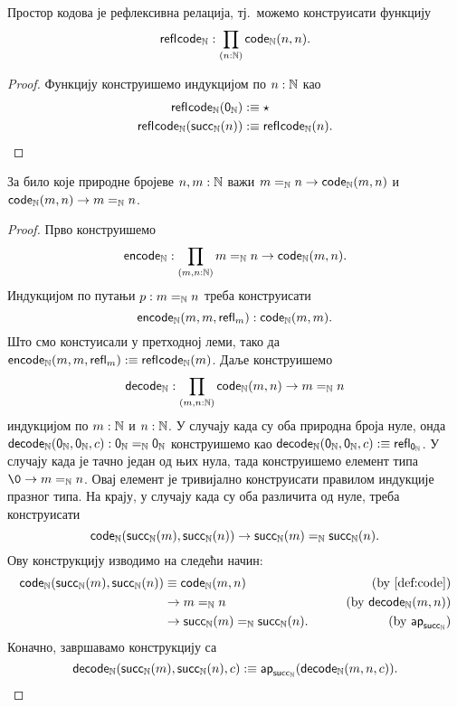 \documentclass[12pt,oneside]{memoir}
\begin{document}
\begin{lemma}
    Простор кодова је рефлексивна релација, тј.~можемо конструисати функцију
    \[\mathsf{refl}_{}\mathsf{code}_{{\mathbb{N}}} : \prod_{(n : {\mathbb{N}})} \mathsf{code}_{{\mathbb{N}}} (n, n).\]
\end{lemma}
\begin{proof}
    Функцију конструишемо индукцијом по $n : {\mathbb{N}}$ као
    \begin{align*}
        \mathsf{refl}_{}\mathsf{code}_{{\mathbb{N}}} (\mathsf{0}_\mathbb{N}) &:\equiv \star \\
        \mathsf{refl}_{}\mathsf{code}_{{\mathbb{N}}} (\mathsf{succ}_\mathbb{N}(n)) &:\equiv \mathsf{refl}_{}\mathsf{code}_{{\mathbb{N}}} (n).
    \end{align*}
\end{proof}

\begin{lemma}
    За било које природне бројеве $n, m : {\mathbb{N}}$ важи $m =_{{\mathbb{N}}} n \to \mathsf{code}_{{\mathbb{N}}} (m, n)$ и $\mathsf{code}_{{\mathbb{N}}} (m, n) \to m =_{{\mathbb{N}}} n$.
\end{lemma}
\begin{proof}
    Прво конструишемо
    \[ \mathsf{encode}_{{\mathbb{N}}} : \prod_{(m, n : {\mathbb{N}})} m =_{{\mathbb{N}}} n \to \mathsf{code}_{{\mathbb{N}}}(m, n). \]
    Индукцијом по путањи $p : m =_{{\mathbb{N}}} n$ треба конструисати 
    \[ \mathsf{encode}_{{\mathbb{N}}} (m, m, \mathsf{refl}_{m}) : \mathsf{code}_{{\mathbb{N}}} (m, m). \]
    Што смо констуисали у претходној леми, тако да $\mathsf{encode}_{{\mathbb{N}}} (m, m, \mathsf{refl}_{m}) :\equiv \mathsf{refl}_{}\mathsf{code}_{{\mathbb{N}}} (m)$.
    Даље конструишемо
    \[ \mathsf{decode}_{{\mathbb{N}}} : \prod_{(m, n : {\mathbb{N}})} \mathsf{code}_{{\mathbb{N}}}(m, n) \to m =_{{\mathbb{N}}} n \]
    индукцијом по $m : {\mathbb{N}}$ и $n : {\mathbb{N}}$. У случају када су оба природна броја нуле, онда $\mathsf{decode}_{{\mathbb{N}}} (\mathsf{0}_\mathbb{N}, \mathsf{0}_\mathbb{N}, c) : \mathsf{0}_\mathbb{N} =_{{\mathbb{N}}} \mathsf{0}_\mathbb{N}$ конструишемо као $\mathsf{decode}_{{\mathbb{N}}} (\mathsf{0}_\mathbb{N}, \mathsf{0}_\mathbb{N}, c) :\equiv \mathsf{refl}_{\mathsf{0}_\mathbb{N}}$.
    У случају када је тачно један од њих нула, тада конструишемо елемент типа $\0 \to m =_{\N} n$. Овај елемент је тривијално конструисати правилом индукције празног типа. На крају, у случају када су оба различита од нуле, треба конструисати  
    \[ \mathsf{code}_{{\mathbb{N}}} (\mathsf{succ}_\mathbb{N}(m), \mathsf{succ}_\mathbb{N}(n)) \to \mathsf{succ}_\mathbb{N}(m) =_{{\mathbb{N}}} \mathsf{succ}_\mathbb{N}(n). \]
    Ову конструкцију изводимо на следећи начин:
    \begin{align*}
        \mathsf{code}_{{\mathbb{N}}} (\mathsf{succ}_\mathbb{N}(m), \mathsf{succ}_\mathbb{N}(n)) &\equiv \mathsf{code}_{{\mathbb{N}}} (m, n) &\qquad (\text{by }\ref{def:code})\\
                                         &\to  m =_{{\mathbb{N}}} n &\qquad (\text{by } \mathsf{decode}_{{\mathbb{N}}}(m, n)) \\
                                         &\to \mathsf{succ}_\mathbb{N}(m) =_{{\mathbb{N}}} \mathsf{succ}_\mathbb{N}(n). &\qquad (\text{by }\mathsf{ap}_{\mathsf{succ}_\mathbb{N}})
    \end{align*}
    Коначно, завршавамо конструкцију са 
    \[ \mathsf{decode}_{{\mathbb{N}}}(\mathsf{succ}_\mathbb{N}(m), \mathsf{succ}_\mathbb{N}(n), c) :\equiv \mathsf{ap}_{\mathsf{succ}_\mathbb{N}} (\mathsf{decode}_{{\mathbb{N}}}(m, n, c)). \]
\end{proof}
\end{document}
